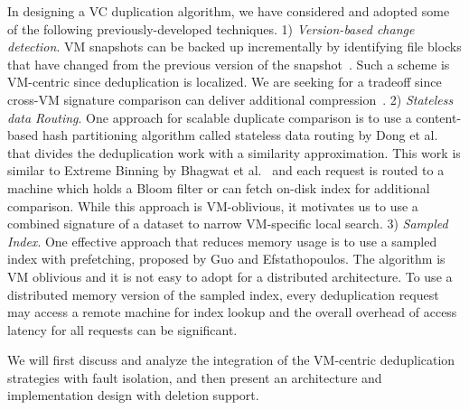 In designing a VC duplication algorithm, we have considered and adopted some of
the following previously-developed techniques.
1)
{\em Version-based change detection}.
VM snapshots can be  backed up  incrementally by identifying file  blocks that have
changed from the previous version of the snapshot~\cite{Clements2009,Vrable2009,TanIPDPS2011}.
Such a scheme  is  VM-centric since deduplication is localized. 
We are seeking for a tradeoff since 
cross-VM  signature comparison can deliver additional compression~\cite{Guo2011,Dong2011,extreme_binning09}.
2) {\em Stateless  data Routing}.
One approach for scalable duplicate comparison is to use a content-based hash
partitioning algorithm called stateless data routing by Dong et al.~\cite{Dong2011} 
that divides the deduplication work with a similarity approximation. This work 
is similar to Extreme Binning by Bhagwat et al.~\cite{extreme_binning09} and 
each request is routed  to a machine which holds
a Bloom filter  or can fetch on-disk index for additional comparison.
While this approach is VM-oblivious, it motivates us to  use  a combined signature of a dataset to narrow
VM-specific local search.
3) {\em Sampled Index}.
One effective approach that reduces memory usage is 
to use a sampled index with prefetching, proposed  by Guo and Efstathopoulos\cite{Guo2011}. 
The algorithm is VM oblivious and it is not easy  to adopt for a distributed architecture. 
To use a distributed memory version of the sampled index, every deduplication request
may access a remote machine for index lookup and the overall overhead of access latency for all requests
can be significant.  


We will first discuss and analyze the integration of the VM-centric deduplication strategies with fault isolation, 
and then present
an architecture and implementation design with deletion support.
